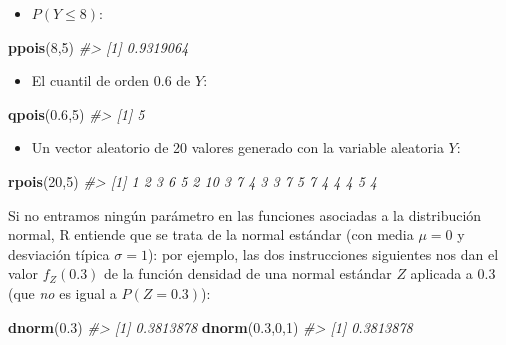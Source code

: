 \documentclass[
]{book}
\newenvironment{Shaded}{\begin{snugshade}}{\end{snugshade}}
\newcommand{\CommentTok}[1]{\textcolor[rgb]{0.56,0.35,0.01}{\textit{#1}}}
\newcommand{\DecValTok}[1]{\textcolor[rgb]{0.00,0.00,0.81}{#1}}
\newcommand{\FloatTok}[1]{\textcolor[rgb]{0.00,0.00,0.81}{#1}}
\newcommand{\KeywordTok}[1]{\textcolor[rgb]{0.13,0.29,0.53}{\textbf{#1}}}
\newcommand{\NormalTok}[1]{#1}
\providecommand{\tightlist}{%
  \setlength{\itemsep}{0pt}\setlength{\parskip}{0pt}}
\theoremstyle{definition}
\theoremstyle{definition}
\theoremstyle{definition}
\theoremstyle{remark}
\begin{document}
\begin{itemize}
\tightlist
\item
  \(P(Y\leqslant 8)\):
\end{itemize}

\begin{Shaded}
\begin{Highlighting}[]
\KeywordTok{ppois}\NormalTok{(}\DecValTok{8}\NormalTok{,}\DecValTok{5}\NormalTok{) }
\CommentTok{\#\textgreater{} [1] 0.9319064}
\end{Highlighting}
\end{Shaded}

\begin{itemize}
\tightlist
\item
  El cuantil de orden 0.6 de \(Y\):
\end{itemize}

\begin{Shaded}
\begin{Highlighting}[]
\KeywordTok{qpois}\NormalTok{(}\FloatTok{0.6}\NormalTok{,}\DecValTok{5}\NormalTok{)}
\CommentTok{\#\textgreater{} [1] 5}
\end{Highlighting}
\end{Shaded}

\begin{itemize}
\tightlist
\item
  Un vector aleatorio de 20 valores generado con la variable aleatoria \(Y\):
\end{itemize}

\begin{Shaded}
\begin{Highlighting}[]
\KeywordTok{rpois}\NormalTok{(}\DecValTok{20}\NormalTok{,}\DecValTok{5}\NormalTok{)}
\CommentTok{\#\textgreater{}  [1]  1  2  3  6  5  2 10  3  7  4  3  3  7  5  7  4  4  4  5  4}
\end{Highlighting}
\end{Shaded}

Si no entramos ningún parámetro en las funciones asociadas a la distribución normal, R entiende que se trata de la normal estándar (con media \(\mu=0\) y desviación típica \(\sigma=1\)): por ejemplo, las dos instrucciones siguientes nos dan el valor \(f_Z(0.3)\) de la función densidad de una normal estándar \(Z\) aplicada a 0.3 (que \emph{no} es igual a \(P(Z=0.3)\)):

\begin{Shaded}
\begin{Highlighting}[]
\KeywordTok{dnorm}\NormalTok{(}\FloatTok{0.3}\NormalTok{)}
\CommentTok{\#\textgreater{} [1] 0.3813878}
\KeywordTok{dnorm}\NormalTok{(}\FloatTok{0.3}\NormalTok{,}\DecValTok{0}\NormalTok{,}\DecValTok{1}\NormalTok{)}
\CommentTok{\#\textgreater{} [1] 0.3813878}
\end{Highlighting}
\end{Shaded}
\end{document}
